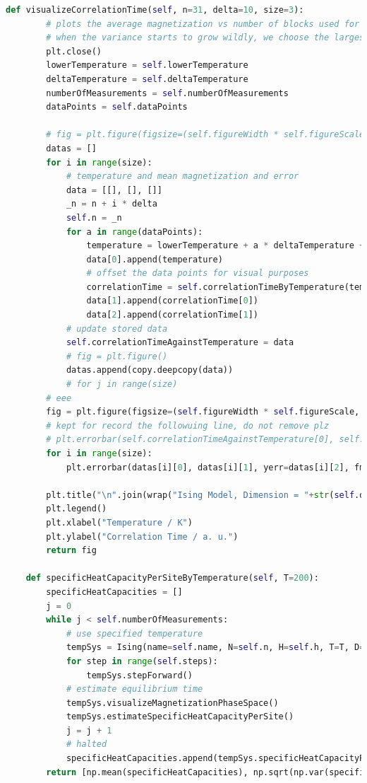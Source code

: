 \documentclass[%
showkeys,
bibnotes,
amsmath,amssymb,
floatfix,
]{revtex4-1}
\begin{document}
\begin{lstlisting}[language=Python]
    def visualizeCorrelationTime(self, n=31, delta=10, size=3):
        # plots the average magnetization vs number of blocks used for measurement
        # when the variance starts to grow wildly, we choose the largest block size with non-diverging error as our correlation length (or time)
        plt.close()
        lowerTemperature = self.lowerTemperature
        deltaTemperature = self.deltaTemperature
        numberOfMeasurements = self.numberOfMeasurements
        dataPoints = self.dataPoints

        # fig = plt.figure(figsize=(self.figureWidth * self.figureScale, self.figureHeight * self.figureScale), dpi=self.figureDpi)
        datas = []
        for i in range(size):
            # temperature and mean magnetization and error
            data = [[], [], []]
            _n = n + i * delta
            self.n = _n
            for a in range(dataPoints):
                temperature = lowerTemperature + a * deltaTemperature + i * 0.1 * deltaTemperature
                data[0].append(temperature)
                # offset the data points for visual purposes
                correlationTime = self.correlationTimeByTemperature(temperature)
                data[1].append(correlationTime[0])
                data[2].append(correlationTime[1])
            # update stored data
            self.correlationTimeAgainstTemperature = data
            # fig = plt.figure()
            datas.append(copy.deepcopy(data))
            # for j in range(size)
        # eee
        fig = plt.figure(figsize=(self.figureWidth * self.figureScale, self.figureHeight * self.figureScale), dpi=self.figureDpi) 
        # kept for record the followuing line, do not remove plz
        # plt.errorbar(self.correlationTimeAgainstTemperature[0], self.correlationTimeAgainstTemperature[1], yerr=self.correlationTimeAgainstTemperature[2], fmt="+k", label="n = "+str(int(_n)))
        for i in range(size):
            plt.errorbar(datas[i][0], datas[i][1], yerr=datas[i][2], fmt="+", label="n = "+str(n + i * delta))

        plt.title("\n".join(wrap("Ising Model, Dimension = "+str(self.d)+", Tc = "+str(sigfig.round(float(self.tc), sigfigs=4))+"K, Time = "+str(self.steps)+"a.u.", 60)))
        plt.legend()
        plt.xlabel("Temperature / K")
        plt.ylabel("Correlation Time / a. u.")
        return fig

    def specificHeatCapacityPerSiteByTemperature(self, T=200):
        specificHeatCapacities = []
        j = 0
        while j < self.numberOfMeasurements:
            # use specified temperature
            tempSys = Ising(name=self.name, N=self.n, H=self.h, T=T, D=self.d, J=self.j, randomFill=self.randomFill, K=self.k, M=self.m, equilibriumTime=self.equilibriumTime, numberOfMeasurements=self.numberOfMeasurements)
            for step in range(self.steps):
                tempSys.stepForward()
            # estimate equilibrium time
            tempSys.visualizeMagnetizationPhaseSpace()
            tempSys.estimateSpecificHeatCapacityPerSite()
            j = j + 1
            # halted
            specificHeatCapacities.append(tempSys.specificHeatCapacityPerSite)
        return [np.mean(specificHeatCapacities), np.sqrt(np.var(specificHeatCapacities))]


\end{lstlisting}
\end{document}
